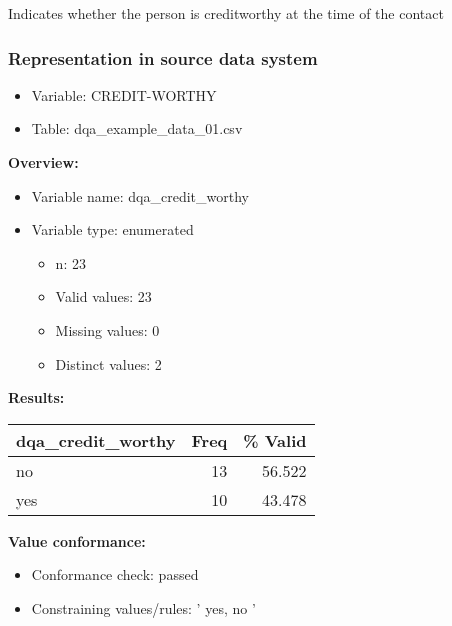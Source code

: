 \documentclass[
]{article}
\providecommand{\tightlist}{%
  \setlength{\itemsep}{0pt}\setlength{\parskip}{0pt}}
\begin{document}
Indicates whether the person is creditworthy at the time of the contact

\hypertarget{representation-in-source-data-system-3}{%
\subsubsection{\texorpdfstring{Representation in \textbf{source} data
system}{Representation in source data system}}\label{representation-in-source-data-system-3}}

\begin{itemize}
\tightlist
\item
  Variable: CREDIT-WORTHY
\item
  Table: dqa\_example\_data\_01.csv
\end{itemize}

\textbf{Overview:}

\begin{itemize}
\tightlist
\item
  Variable name: dqa\_credit\_worthy
\item
  Variable type: enumerated

  \begin{itemize}
  \tightlist
  \item
    n: 23
  \item
    Valid values: 23
  \item
    Missing values: 0
  \item
    Distinct values: 2
  \end{itemize}
\end{itemize}

\textbf{Results:}\\

\begin{table}[H]
\centering
\begin{tabular}{l|r|r}
\hline
\textbf{dqa\_credit\_worthy} & \textbf{Freq} & \textbf{\% Valid}\\
\hline
no & 13 & 56.522\\
\hline
yes & 10 & 43.478\\
\hline
\end{tabular}
\end{table}

\textbf{Value conformance:}

\begin{itemize}
\tightlist
\item
  Conformance check: passed
\item
  Constraining values/rules: ' yes, no '
\end{itemize}
\end{document}
